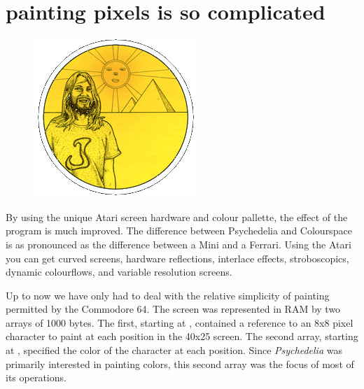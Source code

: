 \chapter{painting pixels is so complicated} 
\label{sec:patterns}
\rhead[]{\leftmark}
\lstset{style=6502Style}

\begin{definition}
\setlength{\intextsep}{0pt}%
\setlength{\columnsep}{3pt}%
\begin{figure}
\includegraphics[width=\linewidth]{src/callout/psych.png} 
\end{figure}
\small
By using the
unique Atari screen hardware and colour pallette, the effect of the program is
much improved.  The difference between Psychedelia and Colourspace is as
pronounced as the difference between a Mini and a Ferrari.  Using the Atari you
can get curved screens, hardware reflections, interlace effects, stroboscopics,
dynamic colourflows, and variable resolution screens.  
\end{definition}

Up to now we have only had to deal with the relative simplicity of painting permitted by the
Commodore 64. The screen was represented in RAM by two arrays of 1000 bytes. The first,
starting at , contained a reference to an 8x8 pixel character to paint at
each position in the 40x25 screen. The second array, starting at , specified
the color of the character at each position. Since \textit{Psychedelia} was primarily interested
in painting colors, this second array was the focus of most of its operations. 

